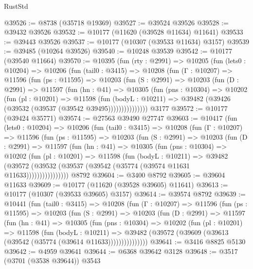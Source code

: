 \begin{lexlean}{RustStd}
\begin{coremodule}
@39526 := @8738 (@35718 @19369)
@39527 := @39524 @39526
@39528 := @39432 @39526
@39532 := @10177 (@11620 (@39528 @11634) @11641)
@39533 := @39443 @39526
@39537 := @10177 (@10307 (@39533 @11634) @3157)
@39539 := @39485 (@10264 @39526)
@39540 := @10248 @39539
@39542 := @10177 (@39540 @11664)
@39570 := @10395
    (fun (rty : @2991) =>
    @10205
      (fun (lets0 : @10204) =>
      @10206
        (fun (tail0 : @3415) =>
        @10208
          (fun (Γ : @10207) =>
          @11596
            (fun (ps : @11595) =>
            @10203
              (fun (S : @2991) =>
              @10203
                (fun (D : @2991) =>
                @11597
                  (fun (hn : @41) =>
                  @10305
                    (fun (pns : @10304) =>
                    @10202
                      (fun (pl : @10201) =>
                      @11598
                        (fun (bodyL : @10211) =>
                        @39482 (@39426 (@39532 (@39537 (@39542 @39495)))))))))))))))
    @3177
@39572 := @10177 (@39424 @35771)
@39574 := @27563 @39490 @27747
@39603 := @10417
    (fun (lets0 : @10204) =>
    @10206
      (fun (tail0 : @3415) =>
      @10208
        (fun (Γ : @10207) =>
        @11596
          (fun (ps : @11595) =>
          @10203
            (fun (S : @2991) =>
            @10203
              (fun (D : @2991) =>
              @11597
                (fun (hn : @41) =>
                @10305
                  (fun (pns : @10304) =>
                  @10202
                    (fun (pl : @10201) =>
                    @11598
                      (fun (bodyL : @10211) =>
                      @39482
                        (@39572
                          (@39532 (@39537 (@39542 (@35774 (@39574 @11631 @11633))))))))))))))))
    @8792
@39604 := @3400 @8792
@39605 := @39604 @11633
@39609 := @10177 (@11620 (@39528 @39605) @11641)
@39613 := @10177 (@10307 (@39533 @39605) @3157)
@39614 := @39574 @8792
@39639 := @10441
    (fun (tail0 : @3415) =>
    @10208
      (fun (Γ : @10207) =>
      @11596
        (fun (ps : @11595) =>
        @10203
          (fun (S : @2991) =>
          @10203
            (fun (D : @2991) =>
            @11597
              (fun (hn : @41) =>
              @10305
                (fun (pns : @10304) =>
                @10202
                  (fun (pl : @10201) =>
                  @11598
                    (fun (bodyL : @10211) =>
                    @39482 (@39572 (@39609 (@39613 (@39542 (@35774 (@39614 @11633)))))))))))))))
@39641 := @3416 @8825 @5130
@39642 := @4959 @39641
@39644 := @6368 @39642 @3128
@39648 := @3517 (@3701 (@3538 @39644)) @3543

\end{coremodule}
\end{lexlean}
